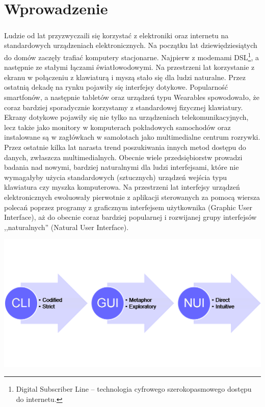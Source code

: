\chapter*{Wprowadzenie}
\paragraph{}
Ludzie od lat przyzwyczaili się korzystać z elektroniki oraz internetu na standardowych urządzeniach elektronicznych. Na początku lat dziewiędziesiątych do domów zaczęły trafiać komputery stacjonarne. Najpierw z modemami DSL\footnote{Digital Subscriber Line – technologia cyfrowego szerokopasmowego dostępu do internetu.}, a następnie ze stałymi łączami światłowodowymi. Na przestrzeni lat korzystanie z ekranu w połączeniu z klawiaturą i myszą stało się dla ludzi naturalne.
\newline
Przez ostatnią dekadę na rynku pojawiły się interfejsy dotykowe. Popularność smartfonów, a następnie tabletów oraz urządzeń typu Wearables\cite{wea} spowodowało, że coraz bardziej sporadycznie korzystamy z standardowej fizycznej klawiatury.
\newline
Ekrany dotykowe pojawiły się nie tylko na urządzeniach telekomunikacyjnych, lecz także jako monitory w komputerach pokładowych samochodów oraz instalowane są w zagłówkach w samolotach jako multimedialne centrum rozrywki\cite{boeing}.
\newline
Przez ostatnie kilka lat narasta trend poszukiwania innych metod dostępu do danych, zwłaszcza multimedialnych. Obecnie wiele przedsiębiorstw prowadzi badania nad nowymi, bardziej naturalnymi dla ludzi interfejsami, które nie wymagałyby użycia standardowych (sztucznych) urządzeń wejścia typu klawiatura czy myszka komputerowa.
\newline
Na przestrzeni lat interfejsy urządzeń elektronicznych ewoluowały pierwotnie z aplikacji sterowanych za pomocą wiersza polecań poprzez programy z graficznym interfejsem użytkownika (Graphic User Interface), aż do obecnie coraz bardziej popularnej i rozwijanej grupy interfejsów ,,naturalnych'' (Natural User Interface).
\begin{center}
\includegraphics[width=1\textwidth]{images/nui.png}
\end{center}

